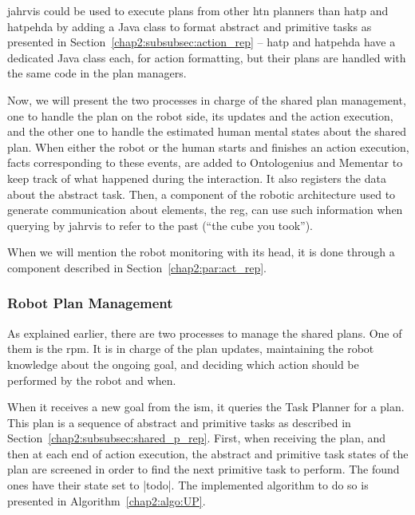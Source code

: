 \documentclass[a4paper,11pt,twoside]{StyleThese}
\begin{document}
\acrshort{jahrvis} could be used to execute plans from other \acrshort{htn} planners than \acrshort{hatp} and \acrshort{hatpehda} by adding a Java class to format abstract and primitive tasks as presented in Section~\ref{chap2:subsubsec:action_rep} -- \acrshort{hatp} and \acrshort{hatpehda} have a dedicated Java class each, for action formatting, but their plans are handled with the same code in the plan managers.

Now, we will present the two processes in charge of the shared plan management, one to handle the plan on the robot side, \ie its updates and the action execution, and the other one to handle the estimated human mental states about the shared plan. When either the robot or the human starts and finishes an action execution, facts corresponding to these events, are added to Ontologenius and Mementar to keep track of what happened during the interaction. It also registers the data about the abstract task. Then, a component of the robotic architecture used to generate communication about elements, the \acrfull{reg}, can use such information when querying by \acrshort{jahrvis} to refer to the past (\eg ``the cube you took'').

When we will mention the robot monitoring with its head, it is done through a component described in Section~\ref{chap2:par:act_rep}.


\subsubsection{Robot Plan Management}\label{chap2:subsubsec:robot_plan}

As explained earlier, there are two processes to manage the shared plans. One of them is the \acrfull{rpm}. It is in charge of the plan updates, maintaining the robot knowledge about the ongoing goal, and deciding which action should be performed by the robot and when. 

When it receives a new goal from the \acrlong{ism}, it queries the Task Planner for a plan. This plan is a sequence of abstract and primitive tasks as described in Section~\ref{chap2:subsubsec:shared_p_rep}. First, when receiving the plan, and then at each end of action execution, the abstract and primitive task states of the plan are screened in order to find the next primitive task to perform. The found ones have their state set to |todo|. The implemented algorithm to do so is presented in Algorithm~\ref{chap2:algo:UP}. 
\end{document}
